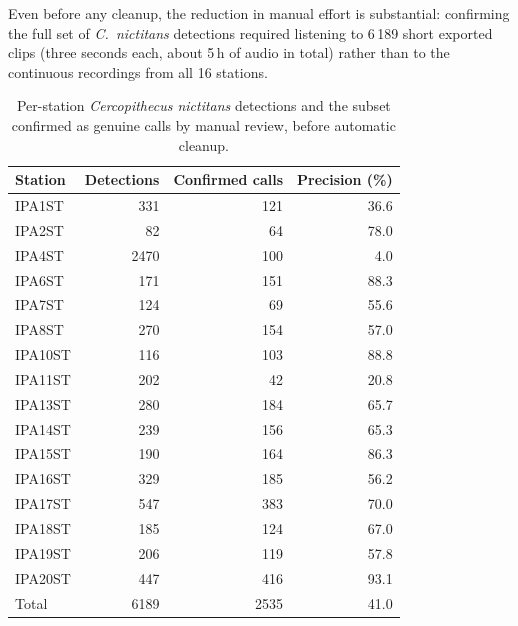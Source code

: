 \documentclass[final,3p,times]{elsarticle}
\begin{document}
Even before any cleanup, the reduction in manual effort is substantial:
confirming the full set of \textit{C.\ nictitans} detections required listening
to 6\,189 short exported clips (three seconds each, about 5\,h of audio in
total) rather than to the continuous recordings from all 16 stations.

\begin{table}[H]
\centering
\caption{Per-station \textit{Cercopithecus nictitans} detections and the
subset confirmed as genuine calls by manual review, before automatic cleanup.}
\label{tab:field}
\begin{tabular}{lrrr}
\toprule
Station & Detections & Confirmed calls & Precision (\%) \\
\midrule
IPA1ST  &  331 & 121 & 36.6 \\
IPA2ST  &   82 &  64 & 78.0 \\
IPA4ST  & 2470 & 100 &  4.0 \\
IPA6ST  &  171 & 151 & 88.3 \\
IPA7ST  &  124 &  69 & 55.6 \\
IPA8ST  &  270 & 154 & 57.0 \\
IPA10ST &  116 & 103 & 88.8 \\
IPA11ST &  202 &  42 & 20.8 \\
IPA13ST &  280 & 184 & 65.7 \\
IPA14ST &  239 & 156 & 65.3 \\
IPA15ST &  190 & 164 & 86.3 \\
IPA16ST &  329 & 185 & 56.2 \\
IPA17ST &  547 & 383 & 70.0 \\
IPA18ST &  185 & 124 & 67.0 \\
IPA19ST &  206 & 119 & 57.8 \\
IPA20ST &  447 & 416 & 93.1 \\
\midrule
Total   & 6189 & 2535 & 41.0 \\
\bottomrule
\end{tabular}
\end{table}

\end{document}

